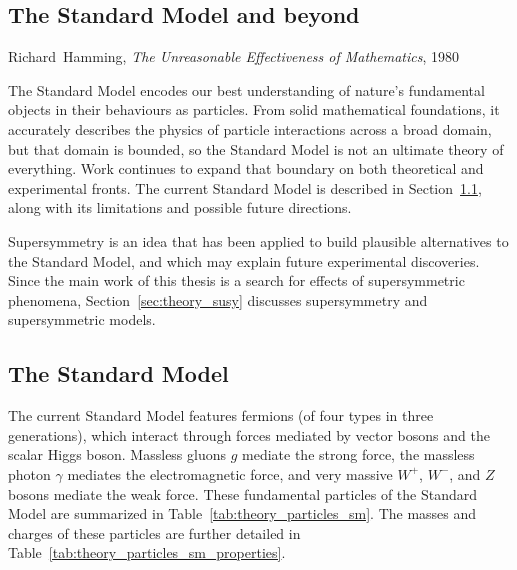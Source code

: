 \begin{singlespacing}
\chapter{The Standard Model and beyond}
\label{chapter:theory}
%
\begin{epigraphs}
%
{Richard~Hamming,
\textit{The Unreasonable Effectiveness of Mathematics},
1980~\cite{hamming1980unreasonable}}
\end{epigraphs}
\end{singlespacing}
\noindent
The Standard Model encodes our best understanding of nature's fundamental
objects in their behaviours as particles.
From solid mathematical foundations, it accurately describes the physics
of particle interactions across a broad domain,
but that domain is bounded, so the Standard Model is not an ultimate theory of
everything.
Work continues to expand that boundary on both theoretical and experimental
fronts.
The current Standard Model is described in Section~\ref{sec:theory_sm},
along with its limitations and possible future directions.

Supersymmetry is an idea that has been applied to build plausible alternatives
to the Standard Model, and which may explain future experimental discoveries.
Since the main work of this thesis is a search for effects of supersymmetric
phenomena, Section~\ref{sec:theory_susy} discusses supersymmetry and
supersymmetric models.


\section{The Standard Model}
\label{sec:theory_sm}
The current Standard Model features fermions
(of four types in three generations),
which interact through forces mediated by vector bosons
and the scalar Higgs boson.
Massless gluons $g$ mediate the strong force,
the massless photon $\gamma$ mediates the electromagnetic force,
and very massive $W^+$, $W^-$, and $Z$ bosons mediate the weak force.
These fundamental particles of the Standard Model are summarized in
Table~\ref{tab:theory_particles_sm}.
The masses and charges of these particles are further detailed in
Table~\ref{tab:theory_particles_sm_properties}.

